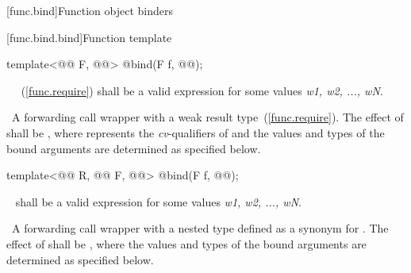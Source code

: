 \documentclass[american,twoside]{book}
\begin{document}
[func.bind]{\marktr{}Function object binders}

%

\setcounter{paragraph}{2}
[func.bind.bind]{Function template }

\begin{itemdecl}
template<@@ F, @@>
  @\unspec@ bind(F f, @@);
\end{itemdecl}

\begin{itemdescr}
\pnum\requires\  ~(\ref{func.require}) shall be a valid expression for some
values \textit{w1, w2, ..., wN}.

\pnum\returns\ A forwarding call wrapper  with a weak result
type~(\ref{func.require}). The effect of  shall
be , where  represents the
\textit{cv}-qualifiers of  and the values and types of the bound
arguments  are determined as specified below. 
\end{itemdescr}       

\begin{itemdecl}
template<@@ R, @@ F, @@> 
  @\unspec@ bind(F f, @@);
\end{itemdecl}

\begin{itemdescr}
\pnum\requires\ 
 shall be  a valid
expression for some
values \textit{w1, w2, ..., wN}.

\pnum\returns\ A forwarding call wrapper  with a nested  type
 defined as a synonym for .  The effect of
 shall be , where the values and types of the bound
arguments  are determined as specified below. 
\end{itemdescr}
\end{document}
